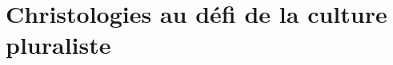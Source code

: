 \documentclass[oneside,10pt]{book}
\begin{document}




%


\part{Christologies au défi de la culture pluraliste}






%
%

%
 
%
%
 

 


%
\end{document}
